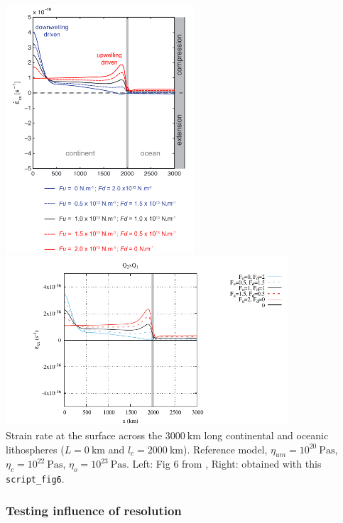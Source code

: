 \begin{center}
\includegraphics[width=7cm]{python_codes/fieldstone_143/images/fig6}
\includegraphics[width=10.5cm]{python_codes/fieldstone_143/results/fig6/fig6a}\\
{\captionfont 
Strain rate at the surface across the $3000~\si{\km}$ long continental and 
oceanic lithospheres ($L=0~\si{\km}$ and $l_ c=2000~\si{\km}$).
Reference model, $\eta_{um}=10^{20}~\si{\pascal\second}$, 
$\eta_c=10^{22}~\si{\pascal\second}$, $\eta_o=10^{23}~\si{\pascal\second}$. 
Left: Fig 6 from \cite{yahb13}, Right: obtained with this  {\tt script\_fig6}.}
\end{center}


\subsubsection*{Testing influence of resolution}

